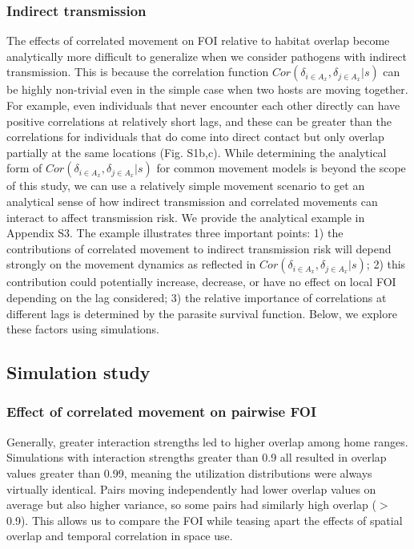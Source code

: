 \documentclass[letterpaper]{article}
\begin{document}
\subsubsection*{Indirect transmission}

The effects of correlated movement on FOI relative to habitat overlap become analytically more difficult to generalize when we consider pathogens with indirect transmission.  This is because the correlation function $Cor(\delta_{i \in A_x}, \delta_{j \in A_x} | s)$ can be highly non-trivial even in the simple case when two hosts are moving together. For example, even individuals that never encounter each other directly can have positive correlations at relatively short lags, and these can be greater than the correlations for individuals that do come into direct contact but only overlap partially at the same locations (Fig. S1b,c).
While determining the analytical form of $Cor(\delta_{i \in A_x}, \delta_{j \in A_x} | s)$ for common movement models is beyond the scope of this study, we can use a relatively simple movement scenario to get an analytical sense of how indirect transmission and correlated movements can interact to affect transmission risk.  We provide the analytical example in Appendix S3. The example illustrates three important points: 1) the contributions of correlated movement to indirect transmission risk will depend strongly on the movement dynamics as reflected in $Cor(\delta_{i \in A_x}, \delta_{j \in A_x} | s)$; 2) this contribution could potentially increase, decrease, or have no effect on local FOI depending on the lag considered; 3) the relative importance of correlations at different lags is determined by the parasite survival function.
Below, we explore these factors using simulations.

\subsection*{Simulation study}

\subsubsection*{Effect of correlated movement on pairwise FOI}

Generally, greater interaction strengths led to higher overlap among home ranges. Simulations with interaction strengths greater than 0.9 all resulted in overlap values greater than 0.99, meaning the utilization distributions were always virtually identical. Pairs moving independently had lower overlap values on average but also higher variance, so some pairs had similarly high overlap ($>$0.9). This allows us to compare the FOI while teasing apart the effects of spatial overlap and temporal correlation in space use. 
\end{document}
